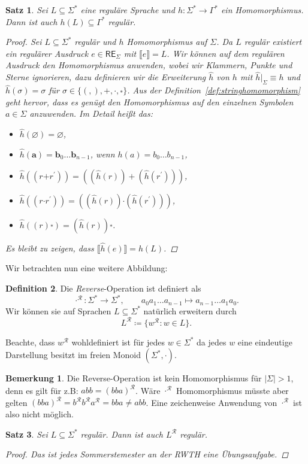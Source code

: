 \documentclass[11pt, a4paper]{article}
\theoremstyle{definition}
\newtheorem{definition}{Definition}[section]
\newtheorem*{remark*}{Bemerkung}
\theoremstyle{plain}
\newtheorem{theorem}[definition]{Satz}
\numberwithin{equation}{section}
\let\emptyset\varnothing
\begin{document}
\begin{theorem}
	Sei $L \subseteq \Sigma^\ast$ eine reguläre Sprache und $h\colon \Sigma^\ast \to \Gamma^\ast$ ein Homomorphismus. Dann ist auch $h(L) \subseteq \Gamma^\ast$ regulär.
	\begin{proof}
		Sei $L \subseteq \Sigma^\ast$ regulär und $h$ Homomorphismus auf $\Sigma$. Da $L$ regulär existiert ein regulärer Ausdruck $e \in \mathsf{RE}_\Sigma$ mit $\llbracket e \rrbracket = L$. Wir können auf dem regulären Ausdruck den Homomorphismus anwenden, wobei wir Klammern, Punkte und Sterne ignorieren, dazu definieren wir die Erweiterung $\hat{h}$ von $h$ mit $\hat{h} \vert_\Sigma \equiv h$ und $\hat{h}(\sigma) = \sigma$ für $\sigma \in \{(,),\bm{+}, \bm{\cdot}, \overset{\bm{\ast}}{}\}$. Aus der Definition~\ref{def:stringhomomorphism} geht hervor, dass es genügt den Homomorphismus auf den einzelnen Symbolen $a \in \Sigma$ anzuwenden. Im Detail heißt das: 
		\begin{itemize}
			\item $\hat{h}(\bm{\emptyset}) = \bm{\emptyset}$,
			\item $\hat{h}(\bm{a}) = \bm{b}_0 \ldots \bm{b}_{n-1}$, wenn $h(a) = b_0 \ldots b_{n-1}$,
			\item $\hat{h}((r \bm{+} r^\prime)) = ((\hat{h}(r)) + (\hat{h}(r^\prime)))$,
			\item $\hat{h}((r \bm{\cdot} r^\prime)) = ((\hat{h}(r)) \bm{\cdot} (\hat{h}(r^\prime)))$,
			\item $\hat{h}((r)\overset{\bm{\ast}}{}) = (\hat{h}(r))\overset{\bm{\ast}}{}$.
		\end{itemize} 
		Es bleibt zu zeigen, dass $\llbracket \hat{h}(e) \rrbracket = h(L)$.
	\end{proof}
\end{theorem}
Wir betrachten nun eine weitere Abbildung:
\begin{definition}
	Die \textit{Reverse}-Operation ist definiert als
	$$
		\cdot^\mathcal{R} \colon \Sigma^\ast \to \Sigma^\ast, \quad\quad a_0 a_1 \ldots a_{n-1} \mapsto a_{n-1} \ldots a_1 a_0.
	$$
	Wir können sie auf Sprachen $L \subseteq \Sigma^\ast$ natürlich erweitern durch
	$$
		L^\mathcal{R} \coloneqq \{ w^\mathcal{R} : w \in L \}.
	$$
\end{definition}
Beachte, dass $w^\mathcal{R}$ wohldefiniert ist für jedes $w \in \Sigma
^\ast$ da jedes $w$ eine eindeutige Darstellung besitzt im freien Monoid $(\Sigma^\ast, \cdot)$.
\begin{remark*}
	Die Reverse-Operation ist kein Homomorphismus für $|\Sigma| > 1$, denn es gilt für z.B: $abb = (bba)^\mathcal{R}$. Wäre $\cdot^\mathcal{R}$ Homomorphismus müsste aber gelten $(bba)^\mathcal{R} = b^\mathcal{R} b^\mathcal{R} a^\mathcal{R} = bba \neq abb$. Eine zeichenweise Anwendung von $\cdot^\mathcal{R}$ ist also nicht möglich.
\end{remark*}
\begin{theorem}
	Sei $L \subseteq \Sigma^\ast$ regulär. Dann ist auch $L^\mathcal{R}$ regulär.
	\begin{proof}
		Das ist jedes Sommerstemester an der RWTH eine Übungsaufgabe.
	\end{proof}
\end{theorem}
\end{document}
